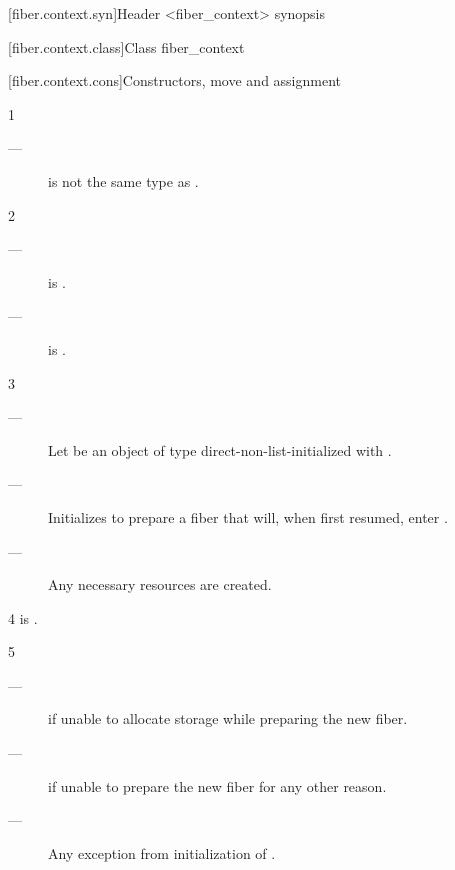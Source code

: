 [fiber.context.syn]{Header <fiber\_context> synopsis}


[fiber.context.class]{Class fiber\_context}


\newcommand{\state}{\cpp{state}}

[fiber.context.cons]{Constructors, move and assignment}


1 \constraints
\begin{description}
    \item[---]  is not the same type as \fiber.
\end{description}

2 \mandates
\begin{description}
    \item[---]  is \true.
    \item[---]  is \true.
\end{description}

3 \effects
\begin{description}
    \item[---] Let  be an object of
               type  direct-non-list-initialized
               with . 
    \item[---] Initializes  to prepare a fiber that will, when
               first resumed, enter .
    \item[---] Any necessary resources are created. 
\end{description}

4 \postcond
\emptyfn is \false.

5 \except
\begin{description}
    \item[---]  if unable to allocate storage while preparing
               the new fiber.
    \item[---]  if unable to prepare the new fiber for any
               other reason.
    \item[---] Any exception from initialization of .
\end{description}

